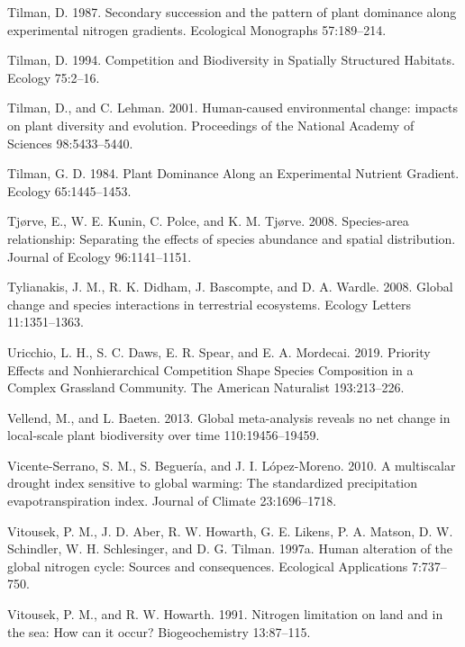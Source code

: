 \documentclass[twoside,12pt,final]{ucthesis-CA2012}
\newlength{\cslhangindent}
\newenvironment{cslreferences}%
  {\setlength{\parindent}{0pt}%
  \everypar{\setlength{\hangindent}{\cslhangindent}}\ignorespaces}%
  {\par}
\begin{document}
\begin{ucmainmatter}
\begin{cslreferences}
\leavevmode\hypertarget{ref-tilman1987}{}%
Tilman, D. 1987. Secondary succession and the pattern of plant dominance along experimental nitrogen gradients. Ecological Monographs 57:189--214.

\leavevmode\hypertarget{ref-Tilman1994}{}%
Tilman, D. 1994. Competition and Biodiversity in Spatially Structured Habitats. Ecology 75:2--16.

\leavevmode\hypertarget{ref-Tilman2001}{}%
Tilman, D., and C. Lehman. 2001. Human-caused environmental change: impacts on plant diversity and evolution. Proceedings of the National Academy of Sciences 98:5433--5440.

\leavevmode\hypertarget{ref-Tilman1984}{}%
Tilman, G. D. 1984. Plant Dominance Along an Experimental Nutrient Gradient. Ecology 65:1445--1453.

\leavevmode\hypertarget{ref-tj2008}{}%
Tjørve, E., W. E. Kunin, C. Polce, and K. M. Tjørve. 2008. Species-area relationship: Separating the effects of species abundance and spatial distribution. Journal of Ecology 96:1141--1151.

\leavevmode\hypertarget{ref-Tylianakis2008}{}%
Tylianakis, J. M., R. K. Didham, J. Bascompte, and D. A. Wardle. 2008. Global change and species interactions in terrestrial ecosystems. Ecology Letters 11:1351--1363.

\leavevmode\hypertarget{ref-Uricchio2019}{}%
Uricchio, L. H., S. C. Daws, E. R. Spear, and E. A. Mordecai. 2019. Priority Effects and Nonhierarchical Competition Shape Species Composition in a Complex Grassland Community. The American Naturalist 193:213--226.

\leavevmode\hypertarget{ref-vellend2013}{}%
Vellend, M., and L. Baeten. 2013. Global meta-analysis reveals no net change in local-scale plant biodiversity over time 110:19456--19459.

\leavevmode\hypertarget{ref-Vicente-Serrano2010}{}%
Vicente-Serrano, S. M., S. Beguería, and J. I. López-Moreno. 2010. A multiscalar drought index sensitive to global warming: The standardized precipitation evapotranspiration index. Journal of Climate 23:1696--1718.

\leavevmode\hypertarget{ref-Vitousek1997b}{}%
Vitousek, P. M., J. D. Aber, R. W. Howarth, G. E. Likens, P. A. Matson, D. W. Schindler, W. H. Schlesinger, and D. G. Tilman. 1997a. Human alteration of the global nitrogen cycle: Sources and consequences. Ecological Applications 7:737--750.

\leavevmode\hypertarget{ref-Vitousek1991}{}%
Vitousek, P. M., and R. W. Howarth. 1991. Nitrogen limitation on land and in the sea: How can it occur? Biogeochemistry 13:87--115.


\end{cslreferences}
\end{ucmainmatter}
\end{document}
